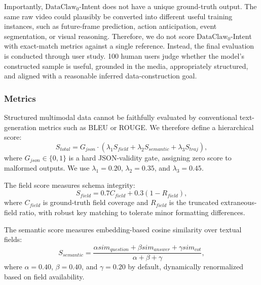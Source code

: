 Importantly, $\text{DataClaw}_0$-Intent does not have a unique ground-truth output. The same raw video could plausibly be converted into different useful training instances, such as future-frame prediction, action anticipation, event segmentation, or visual reasoning. Therefore, we do not score $\text{DataClaw}_0$-Intent with exact-match metrics against a single reference. Instead, the final evaluation is conducted through user study. 100 human users judge whether the model's constructed sample is useful, grounded in the media, appropriately structured, and aligned with a reasonable inferred data-construction goal.


\subsubsection{Metrics}

Structured multimodal data cannot be faithfully evaluated by conventional text-generation metrics such as BLEU or ROUGE. We therefore define a hierarchical score:
\begin{equation}
S_{total}=G_{json}\cdot
(\lambda_1S_{field}+\lambda_2S_{semantic}+\lambda_3S_{traj}),
\end{equation}
where \(G_{json}\in\{0,1\}\) is a hard JSON-validity gate, assigning zero score to malformed outputs. We use \(\lambda_1=0.20\), \(\lambda_2=0.35\), and \(\lambda_3=0.45\).

The field score measures schema integrity:
\begin{equation}
S_{field}=0.7C_{field}+0.3(1-R_{field}),
\end{equation}
where \(C_{field}\) is ground-truth field coverage and \(R_{field}\) is the truncated extraneous-field ratio, with robust key matching to tolerate minor formatting differences.

The semantic score measures embedding-based cosine similarity over textual fields:
\begin{equation}
S_{semantic}
=
\frac{
\alpha sim_{question}+\beta sim_{answer}+\gamma sim_{cot}
}{
\alpha+\beta+\gamma
},
\end{equation}
where \(\alpha=0.40\), \(\beta=0.40\), and \(\gamma=0.20\) by default, dynamically renormalized based on field availability.


